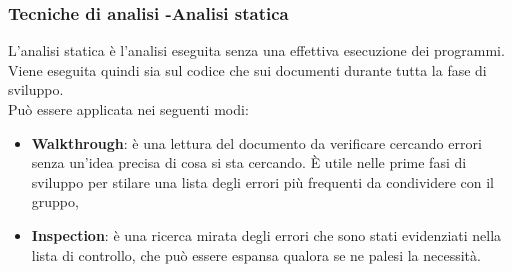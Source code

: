 \documentclass[12pt,a4paper,titlepage]{article}
\begin{document}
\subsubsection{Tecniche di analisi -Analisi statica}
		L'analisi statica è l'analisi eseguita senza una effettiva esecuzione dei programmi. Viene eseguita quindi sia sul codice che sui documenti durante tutta la fase di sviluppo.\\
		Può essere applicata nei seguenti modi:
		\begin{itemize}
			\item \textbf{Walkthrough}: è una lettura del documento da verificare cercando errori senza un'idea precisa di cosa si sta cercando. È utile nelle prime fasi di sviluppo per stilare una lista degli errori più frequenti da condividere con il gruppo,
			\item \textbf{Inspection}: è una ricerca mirata degli errori che sono stati evidenziati nella lista di controllo, che può essere espansa qualora se ne palesi la necessità.
		\end{itemize}
\end{document}
